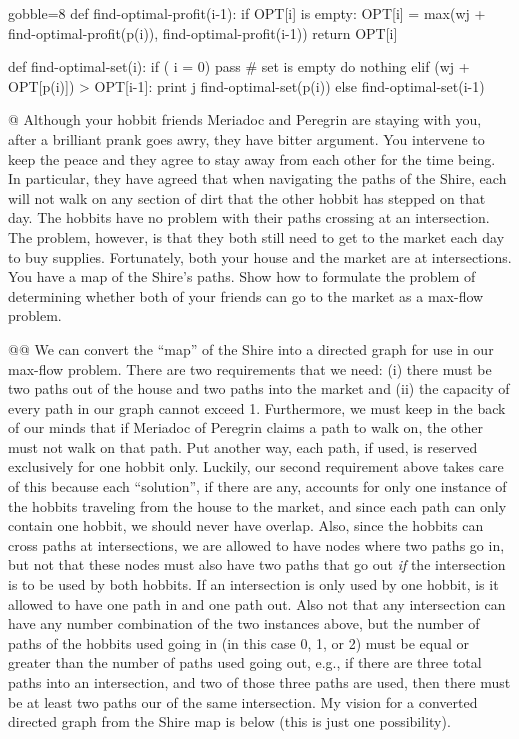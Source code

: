 \documentclass[10pt]{article}\usepackage[]{graphicx}\usepackage[]{xcolor}
\begin{document}
\begin{easylist}[enumerate]
\begin{pythoncode*}{gobble=8}
        def find-optimal-profit(i-1):
            if OPT[i] is empty:
                OPT[i] = max(wj + find-optimal-profit(p(i)),
                                find-optimal-profit(i-1))
            return OPT[i]

        def find-optimal-set(i):
            if ( i = 0)
                pass  # set is empty do nothing
            elif (wj + OPT[p(i)]) > OPT[i-1]:
                print j
                find-optimal-set(p(i))
            else
                find-optimal-set(i-1)
    \end{pythoncode*}

    @ Although your hobbit friends Meriadoc and Peregrin are staying with you, after a brilliant prank goes awry, they
    have bitter argument. You intervene to keep the peace and they agree to stay away from each other for the time
    being. In particular, they have agreed that when navigating the paths of the Shire, each will not walk on any
    section of dirt that the other hobbit has stepped on that day. The hobbits have no problem with their paths crossing
    at an intersection. The problem, however, is that they both still need to get to the market each day to buy
    supplies.  Fortunately, both your house and the market are at intersections. You have a map of the Shire's paths.
    Show how to formulate the problem of determining whether both of your friends can go to the market as a max-flow
    problem.

    @@ We can convert the ``map'' of the Shire into a directed graph for use in our max-flow problem. There are two
    requirements that we need: (i) there must be two paths out of the house and two paths into the market and (ii) the
    capacity of every path in our graph cannot exceed 1. Furthermore, we must keep in the back of our minds that if
    Meriadoc of Peregrin claims a path to walk on, the other must not walk on that path. Put another way, each path, if
    used, is reserved exclusively for one hobbit only. Luckily, our second requirement above takes care of this because
    each ``solution'', if there are any, accounts for only one instance of the hobbits traveling from the house to the
    market, and since each path can only contain one hobbit, we should never have overlap. Also, since the hobbits can
    cross paths at intersections, we are allowed to have nodes where two paths go in, but not that these nodes must also
    have two paths that go out \textit{if} the intersection is to be used by both hobbits. If an intersection is only
    used by one hobbit, is it allowed to have one path in and one path out. Also not that any intersection can have any
    number combination of the two instances above, but the number of paths of the hobbits used going in (in this case
    0, 1, or 2) must be equal or greater than the number of paths used going out, e.g., if there are three total paths
    into an intersection, and two of those three paths are used, then there must be at least two paths our of the same
    intersection. My vision for a converted directed graph from the Shire map is below (this is just one possibility).


\end{easylist}
\end{document}
